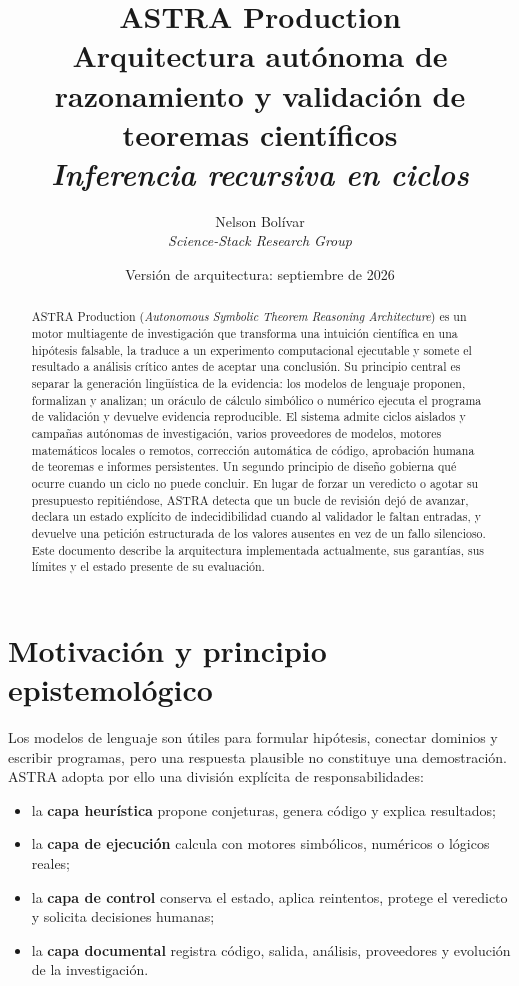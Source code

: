 \documentclass[11pt,a4paper]{article}
\title{\textbf{ASTRA Production}\\[2mm]
\large Arquitectura autónoma de razonamiento y validación de teoremas científicos\\[1mm]
\normalsize\textit{Inferencia recursiva en ciclos}}
\author{Nelson Bolívar\\\textit{Science-Stack Research Group}}
\date{Versión de arquitectura: septiembre de 2026}
\begin{document}
\maketitle

\begin{abstract}
ASTRA Production (\textit{Autonomous Symbolic Theorem Reasoning Architecture}) es un motor multiagente de investigación que transforma una intuición científica en una hipótesis falsable, la traduce a un experimento computacional ejecutable y somete el resultado a análisis crítico antes de aceptar una conclusión. Su principio central es separar la generación lingüística de la evidencia: los modelos de lenguaje proponen, formalizan y analizan; un oráculo de cálculo simbólico o numérico ejecuta el programa de validación y devuelve evidencia reproducible. El sistema admite ciclos aislados y campañas autónomas de investigación, varios proveedores de modelos, motores matemáticos locales o remotos, corrección automática de código, aprobación humana de teoremas e informes persistentes. Un segundo principio de diseño gobierna qué ocurre cuando un ciclo no puede concluir. En lugar de forzar un veredicto o agotar su presupuesto repitiéndose, ASTRA detecta que un bucle de revisión dejó de avanzar, declara un estado explícito de indecidibilidad cuando al validador le faltan entradas, y devuelve una petición estructurada de los valores ausentes en vez de un fallo silencioso. Este documento describe la arquitectura implementada actualmente, sus garantías, sus límites y el estado presente de su evaluación.
\end{abstract}

\section{Motivación y principio epistemológico}

Los modelos de lenguaje son útiles para formular hipótesis, conectar dominios y escribir programas, pero una respuesta plausible no constituye una demostración. ASTRA adopta por ello una división explícita de responsabilidades:

\begin{itemize}
  \item la \textbf{capa heurística} propone conjeturas, genera código y explica resultados;
  \item la \textbf{capa de ejecución} calcula con motores simbólicos, numéricos o lógicos reales;
  \item la \textbf{capa de control} conserva el estado, aplica reintentos, protege el veredicto y solicita decisiones humanas;
  \item la \textbf{capa documental} registra código, salida, análisis, proveedores y evolución de la investigación.
\end{itemize}
\end{document}
